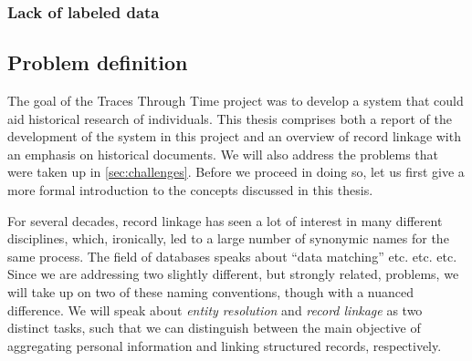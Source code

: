 \subsubsection{Lack of labeled data}




\subsection{Problem definition}
The goal of the Traces Through Time project was to develop a system that could aid historical research of individuals.
This thesis comprises both a report of the development of the system in this project and an overview of record linkage with an emphasis on historical documents.
We will also address the problems that were taken up in \cref{sec:challenges}.
Before we proceed in doing so, let us first give a more formal introduction to the concepts discussed in this thesis.

For several decades, record linkage has seen a lot of interest in many different disciplines, which, ironically, led to a large number of synonymic names for the same process.
The field of databases speaks about ``data matching''  etc. etc. etc.
Since we are addressing two slightly different, but strongly related, problems, we will take up on two of these naming conventions, though with a nuanced difference.
We will speak about \emph{entity resolution} and \emph{record linkage} as two distinct tasks, such that we can distinguish between the main objective of aggregating personal information and linking structured records, respectively.

